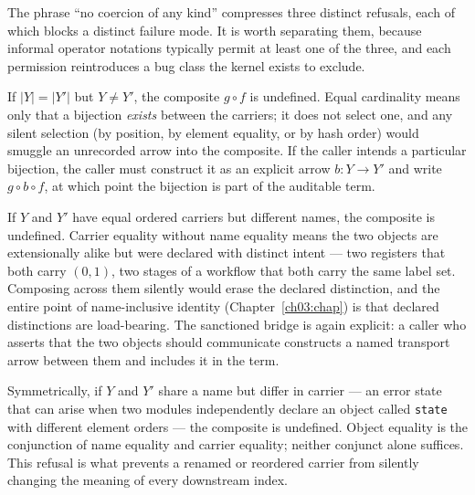 The phrase ``no coercion of any kind'' compresses three distinct refusals,
each of which blocks a distinct failure mode. It is worth separating them,
because informal operator notations typically permit at least one of the
three, and each permission reintroduces a bug class the kernel exists to
exclude.

\begin{ruleenv}
\label{ch04:rule:card}
If $|Y| = |Y'|$ but $Y \ne Y'$, the composite $g \circ f$ is undefined. Equal
cardinality means only that a bijection \emph{exists} between the carriers;
it does not select one, and any silent selection (by position, by element
equality, or by hash order) would smuggle an unrecorded arrow into the
composite. If the caller intends a particular bijection, the caller must
construct it as an explicit arrow $b : Y \to Y'$ and write
$g \circ b \circ f$, at which point the bijection is part of the auditable
term.
\end{ruleenv}

\begin{ruleenv}
\label{ch04:rule:carrier}
If $Y$ and $Y'$ have equal ordered carriers but different names, the
composite is undefined. Carrier equality without name equality means the two
objects are extensionally alike but were declared with distinct intent ---
two registers that both carry $(0, 1)$, two stages of a workflow that both
carry the same label set. Composing across them silently would erase the
declared distinction, and the entire point of name-inclusive identity
(Chapter~\ref{ch03:chap}) is that declared distinctions are load-bearing. The
sanctioned bridge is again explicit: a caller who asserts that the two
objects should communicate constructs a named transport arrow between them
and includes it in the term.
\end{ruleenv}

\begin{ruleenv}
\label{ch04:rule:name}
Symmetrically, if $Y$ and $Y'$ share a name but differ in carrier --- an
error state that can arise when two modules independently declare an object
called \texttt{state} with different element orders --- the composite is
undefined. Object equality is the conjunction of name equality and carrier
equality; neither conjunct alone suffices. This refusal is what prevents a
renamed or reordered carrier from silently changing the meaning of every
downstream index.
\end{ruleenv}

